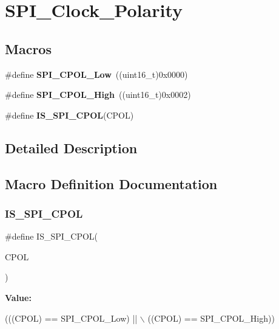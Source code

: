 \section{S\+P\+I\+\_\+\+Clock\+\_\+\+Polarity}
\label{group__SPI__Clock__Polarity}
\subsection*{Macros}
\begin{DoxyCompactItemize}
\item 
\#define \textbf{ S\+P\+I\+\_\+\+C\+P\+O\+L\+\_\+\+Low}~((uint16\+\_\+t)0x0000)
\item 
\#define \textbf{ S\+P\+I\+\_\+\+C\+P\+O\+L\+\_\+\+High}~((uint16\+\_\+t)0x0002)
\item 
\#define \textbf{ I\+S\+\_\+\+S\+P\+I\+\_\+\+C\+P\+OL}(C\+P\+OL)
\end{DoxyCompactItemize}


\subsection{Detailed Description}


\subsection{Macro Definition Documentation}
\mbox{\label{group__SPI__Clock__Polarity_gafc1cc5b1ff7e801a409a7a1e6047acf9}} 
\subsubsection{I\+S\+\_\+\+S\+P\+I\+\_\+\+C\+P\+OL}
{\footnotesize\ttfamily \#define I\+S\+\_\+\+S\+P\+I\+\_\+\+C\+P\+OL(\begin{DoxyParamCaption}\item[{}]{C\+P\+OL }\end{DoxyParamCaption})}

{\bfseries Value\+:}
\begin{DoxyCode}
(((CPOL) == SPI_CPOL_Low) || \(\backslash\)
                           ((CPOL) == SPI_CPOL_High))
\end{DoxyCode}


